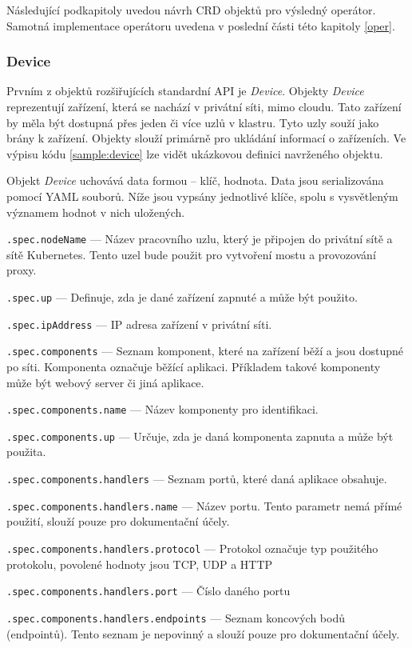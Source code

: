 Následující podkapitoly uvedou návrh CRD objektů pro výsledný operátor. Samotná implementace operátoru uvedena v poslední části této kapitoly \ref{oper}.  

\subsubsection*{Device}
Prvním z objektů rozšiřujících standardní API je \textit{Device}. Objekty \textit{Device} reprezentují zařízení, která se nachází v privátní síti, mimo cloudu. Tato zařízení by měla být dostupná přes jeden či více uzlů v klastru. Tyto uzly souží jako brány k zařízení. Objekty slouží primárně pro ukládání informací o zařízeních. Ve výpisu kódu \ref{sample:device} lze vidět ukázkovou definici navrženého objektu.



Objekt \textit{Device} uchovává data formou -- klíč, hodnota. Data jsou serializována pomocí YAML souborů. Níže jsou vypsány jednotlivé klíče, spolu s vysvětleným významem hodnot v nich uložených.

\begin{description}
    \item \verb|.spec.nodeName| --- Název pracovního uzlu, který je připojen do privátní sítě a sítě Kubernetes. Tento uzel bude použit pro vytvoření mostu a provozování proxy.
    \item \verb|.spec.up| --- Definuje, zda je dané zařízení zapnuté a může být použito.
    \item \verb|.spec.ipAddress| --- IP adresa zařízení v privátní síti.
    \item \verb|.spec.components| --- Seznam komponent, které na zařízení běží a jsou dostupné po síti. Komponenta označuje běžící aplikaci. Příkladem takové komponenty může být webový server či jiná aplikace.  
    \item \verb|.spec.components.name| --- Název komponenty pro identifikaci.
    \item \verb|.spec.components.up| --- Určuje, zda je daná komponenta zapnuta a může být použita.
    \item \verb|.spec.components.handlers| --- Seznam portů, které daná aplikace obsahuje.
    \item \verb|.spec.components.handlers.name| --- Název portu. Tento parametr nemá přímé použití, slouží pouze pro dokumentační účely. 
    \item \verb|.spec.components.handlers.protocol| --- Protokol označuje typ použitého protokolu, povolené hodnoty jsou TCP, UDP a HTTP
    \item \verb|.spec.components.handlers.port| --- Číslo daného portu
    \item \verb|.spec.components.handlers.endpoints| --- Seznam koncových bodů (endpointů). Tento seznam je nepovinný a slouží pouze pro dokumentační účely.
\end{description}


